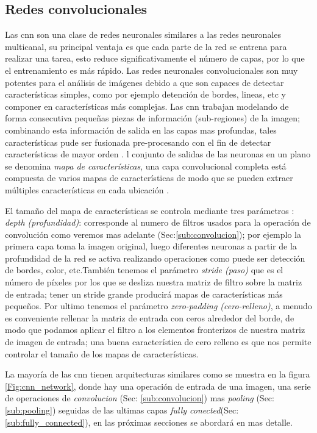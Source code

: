 \subsection{Redes convolucionales}\label{sub:cnn}

Las \ac{cnn} son una clase de redes neuronales  similares a las redes neuronales multicanal, su principal ventaja es que cada parte de la red se entrena para realizar una tarea, esto reduce significativamente el número de capas, por lo que el entrenamiento es más rápido. Las redes neuronales convolucionales son muy potentes para el análisis de imágenes debido a que son capaces de detectar características simples, como por ejemplo detención de bordes, lineas, etc y componer en características más complejas. Las \ac{cnn} trabajan modelando de forma consecutiva pequeñas piezas de información (sub-regiones) de la imagen; combinando esta información de salida en las capas mas profundas, tales características pude ser fusionada pre-procesando con el fin de detectar características de mayor orden \citep{murphy}. l conjunto de salidas de las neuronas en un plano se denomina \textit{mapa de características}, una capa convolucional completa está compuesta de varios mapas de características de modo que se pueden extraer múltiples características en cada ubicación \citep{cnns}.

El tamaño del mapa de características se controla mediante tres parámetros \citep{cnnsarticle}: \textit{depth (profundidad)}: corresponde al numero de filtros usados para la operación de convolución como veremos mas adelante (Sec:\ref{sub:convolucion}); por ejemplo la primera capa toma la imagen original, luego diferentes neuronas a partir de la profundidad de la red se activa realizando operaciones como puede ser detección de bordes, color, etc.También tenemos el parámetro \textit{stride (paso)} que es el número de píxeles por los que se desliza nuestra matriz de filtro sobre la matriz de entrada; tener un stride grande producirá mapas de características más pequeños. Por ultimo tenemos el parámetro \textit{zero-padding (cero-relleno)}, a menudo es conveniente rellenar la matriz de entrada con ceros alrededor del borde, de modo que podamos aplicar el filtro a los elementos fronterizos de nuestra matriz de imagen de entrada; una buena característica de cero relleno es que nos permite controlar el tamaño de los mapas de características.

La mayoría de las \ac{cnn} tienen arquitecturas similares como se muestra en la figura \ref{Fig:cnn_network}, donde hay una operación de entrada de una imagen, una serie de operaciones de  \textit{convolucion} (Sec: \ref{sub:convolucion}) mas  \textit{pooling} (Sec: \ref{sub:pooling}) seguidas de las ultimas capas \textit{fully conected}(Sec: \ref{sub:fully_connected}), en las próximas secciones se abordará en mas detalle. 

